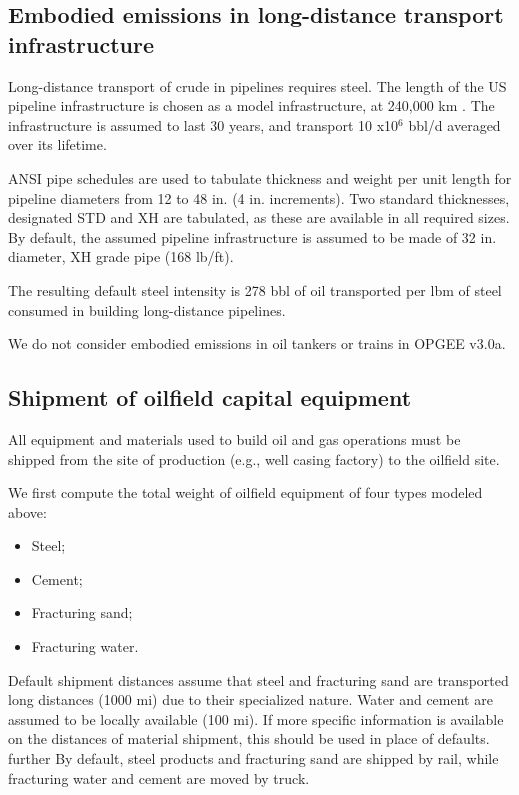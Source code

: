 \documentclass[11pt]{report}
\newcommand{\marg}[1]{{\footnotesize\textit{\textcolor{stanford}{'#1'}}}}
\newcommand{\marginnote}[1]{\marginpar{\marg{#1}}}
\newcommand{\version}{v3.0a}
\begin{document}
{{{{\subsection{Embodied emissions in long-distance transport infrastructure}

Long-distance transport of crude in pipelines requires steel. The length of the US pipeline infrastructure is chosen as a model \marginnote{Embodied Emissions 5.1.1-2} infrastructure, at 240,000 km \cite{CIA2013}. The infrastructure is assumed to last 30 years, and transport 10 x10$^6$ bbl/d averaged over \marginnote{Embodied Emissions 5.1.7-8} its lifetime.

ANSI pipe schedules \cite[Table 9.7]{Arnold2007} are used to tabulate thickness and weight per unit length for pipeline diameters from 12 to 48 in. (4 in. increments). Two standard thicknesses, designated STD and XH are tabulated, as these are available in all required sizes. By default, \marginnote{Embodied Emissions 5.1.3-4} the assumed pipeline infrastructure is assumed to be made of 32 in. diameter, XH grade pipe (168 lb/ft). 

The resulting default steel intensity is 278 bbl of oil \marginnote{Embodied Emissions 5.1.11} transported per lbm of steel consumed in building long-distance pipelines.

We do not consider embodied emissions in oil tankers or trains in OPGEE \version.

\subsection{Shipment of oilfield capital equipment}

All equipment and materials used to build oil and gas operations must be shipped from the site of production (e.g., well casing factory) to the oilfield site.

We first \marginnote{Embodied Emissions 6.1} compute the total weight of oilfield equipment of four types modeled above:
\begin{itemize}
\item Steel;
\item Cement;
\item Fracturing sand;
\item Fracturing water.
\end{itemize}

Default shipment distances \marginnote{Embodied Emissions 6.2} assume that steel and fracturing sand are transported long distances (1000 mi) due to their specialized nature. Water and cement are assumed to be locally available (100 mi). If more specific information is available on the distances of material shipment, this should be used in place of defaults.  \marginnote{Embodied Emissions 6.3} further By default, steel products and fracturing sand are shipped by rail, while fracturing water and cement are moved by truck. 

}}}}
\end{document}
